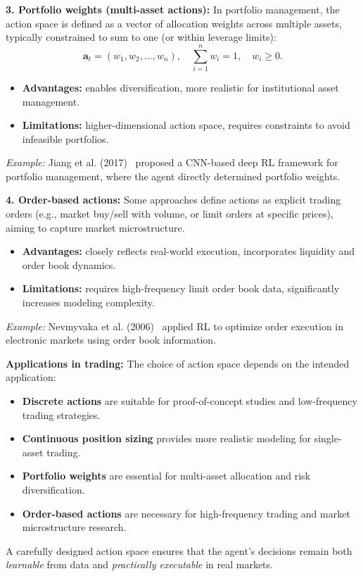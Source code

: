 \documentclass[12pt,a4paper]{report}
\begin{document}
\bigskip
\textbf{3. Portfolio weights (multi-asset actions):}  
In portfolio management, the action space is defined as a vector of allocation weights across multiple assets, typically constrained to sum to one (or within leverage limits):
\[
\mathbf{a}_t = (w_1, w_2, \ldots, w_n), \quad \sum_{i=1}^{n} w_i = 1, \quad w_i \geq 0.
\]
\begin{itemize}
    \item \textbf{Advantages:} enables diversification, more realistic for institutional asset management.
    \item \textbf{Limitations:} higher-dimensional action space, requires constraints to avoid infeasible portfolios.
\end{itemize}
\textit{Example:} Jiang et al. (2017)~\cite{jiang2017deeprl} proposed a CNN-based deep RL framework for portfolio management, where the agent directly determined portfolio weights.

\bigskip
\textbf{4. Order-based actions:}  
Some approaches define actions as explicit trading orders (e.g., market buy/sell with volume, or limit orders at specific prices), aiming to capture market microstructure.  
\begin{itemize}
    \item \textbf{Advantages:} closely reflects real-world execution, incorporates liquidity and order book dynamics.
    \item \textbf{Limitations:} requires high-frequency limit order book data, significantly increases modeling complexity.
\end{itemize}
\textit{Example:} Nevmyvaka et al. (2006)~\cite{nevmyvaka2006reinforcement} applied RL to optimize order execution in electronic markets using order book information.

\bigskip
\textbf{Applications in trading:}  
The choice of action space depends on the intended application:
\begin{itemize}
    \item \textbf{Discrete actions} are suitable for proof-of-concept studies and low-frequency trading strategies.
    \item \textbf{Continuous position sizing} provides more realistic modeling for single-asset trading.
    \item \textbf{Portfolio weights} are essential for multi-asset allocation and risk diversification.
    \item \textbf{Order-based actions} are necessary for high-frequency trading and market microstructure research.
\end{itemize}
A carefully designed action space ensures that the agent’s decisions remain both \textit{learnable} from data and \textit{practically executable} in real markets.
\end{document}
